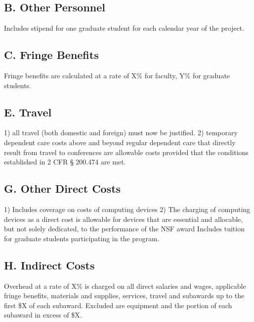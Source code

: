 \subsection*{B. Other Personnel}
 Includes stipend for one graduate student for each calendar year of the project.


\subsection*{C. Fringe Benefits}
Fringe benefits are calculated at a rate of X\% for faculty, Y\% for graduate students.
\subsection*{E. Travel}
1) all travel (both domestic and foreign) must now be justified.
2) temporary dependent care costs above and beyond regular dependent care that directly result from travel to conferences are allowable costs provided that the conditions established in 2 CFR § 200.474 are met.
\subsection*{G. Other Direct Costs}
1) Includes coverage on costs of computing devices
2) The charging of computing devices as a direct cost is allowable for devices that are essential and allocable, but not solely dedicated, to the performance of the NSF award
 Includes tuition for graduate students participating in the program.
\subsection*{H. Indirect Costs}
Overhead at a rate of X\% is charged on all direct salaries and wages, applicable fringe benefits, materials and supplies, services, travel and subawards up to the first \$X of each subaward. Excluded are equipment and the portion of each subaward in excess of \$X.
\fi
